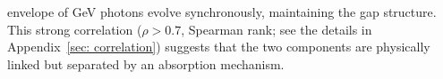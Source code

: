 \documentclass[prd,twocolumn,amsmath,amssymb,aps,linenumbers]{revtex4-2} %
\begin{document}
envelope of GeV photons evolve synchronously, maintaining the gap structure. This strong correlation ($\rho > 0.7$, Spearman rank; see the details in Appendix~\ref{sec: correlation}) suggests that the two components are physically linked but separated by an absorption mechanism.



\end{document}
